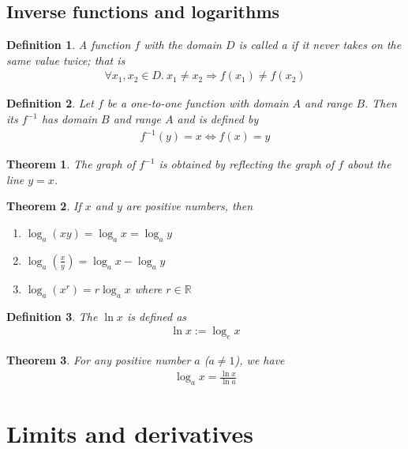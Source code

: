 \documentclass{article}
\theoremstyle{sltheorem}
\newtheorem{definition}{Definition}[section]
\newtheorem{theorem}{Theorem}[section]
\newcommand{\R}{\mathbb{R}}
\begin{document}
\subsection{Inverse functions and logarithms}
\begin{definition}
    A function $f$ with the domain $D$ is called a  if it never takes on the same value twice; that is
    \begin{align*}
        \forall x_1, x_2 \in D.\: x_1\not=x_2 \Rightarrow f(x_1)\not= f(x_2)
    \end{align*}
\end{definition}
\begin{definition}
    Let $f$ be a one-to-one function with domain $A$ and range $B$. Then its  $f^{-1}$ has domain $B$ and range $A$ and is defined by
    \begin{align*}
        f^{-1}(y) = x \Leftrightarrow f(x) = y
    \end{align*}
\end{definition}
\begin{theorem}
    The graph of $f^{-1}$ is obtained by reflecting the graph of $f$ about the line $y=x$.
\end{theorem}
\begin{theorem}
    If $x$ and $y$ are positive numbers, then
    \begin{enumerate}
        \item $\log_a(xy)=\log_ax=\log_ay$
        \item $\log_a(\frac{x}{y}) = \log_ax - \log_ay$
        \item $\log_a(x^r)=r\log_ax$ where $r\in\R$
    \end{enumerate}
\end{theorem}
\begin{definition}
    The  $\ln x$ is defined as
    \begin{align*}
        \ln x := \log_e x
    \end{align*}
\end{definition}
\begin{theorem}
    For any positive number $a$ ($a\not=1$), we have
    \begin{align*}
        \log_a x = \frac{\ln x}{\ln a}
    \end{align*}
\end{theorem}
\section{Limits and derivatives}
\setcounter{subsection}{1}
\end{document}

